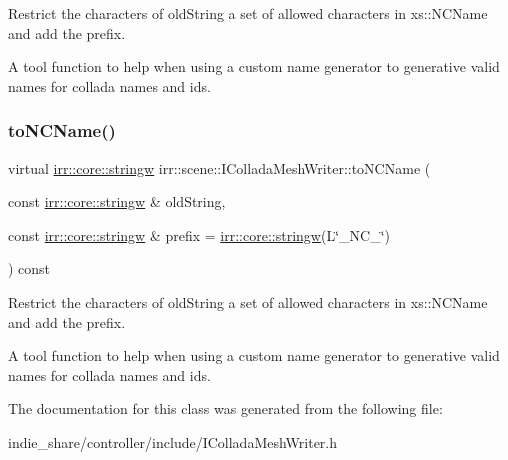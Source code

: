 Restrict the characters of old\+String a set of allowed characters in xs\+::\+N\+C\+Name and add the prefix. 

A tool function to help when using a custom name generator to generative valid names for collada names and id\textquotesingle{}s. \mbox{\label{classirr_1_1scene_1_1IColladaMeshWriter_ac9c48beab095aa6f4cb4f696bb2ecd45}} 
\subsubsection{\texorpdfstring{to\+N\+C\+Name()}{toNCName()}\hspace{0.1cm}{\footnotesize\ttfamily [2/2]}}
{\footnotesize\ttfamily virtual \hyperlink{namespaceirr_1_1core_a5aedb62cb47cf01d1c548ab5e6344d2d}{irr\+::core\+::stringw} irr\+::scene\+::\+I\+Collada\+Mesh\+Writer\+::to\+N\+C\+Name (\begin{DoxyParamCaption}\item[{const \hyperlink{namespaceirr_1_1core_a5aedb62cb47cf01d1c548ab5e6344d2d}{irr\+::core\+::stringw} \&}]{old\+String,  }\item[{const \hyperlink{namespaceirr_1_1core_a5aedb62cb47cf01d1c548ab5e6344d2d}{irr\+::core\+::stringw} \&}]{prefix = {\ttfamily \hyperlink{namespaceirr_1_1core_a5aedb62cb47cf01d1c548ab5e6344d2d}{irr\+::core\+::stringw}(L\char`\"{}\+\_\+NC\+\_\+\char`\"{})} }\end{DoxyParamCaption}) const\hspace{0.3cm}{\ttfamily [pure virtual]}}



Restrict the characters of old\+String a set of allowed characters in xs\+::\+N\+C\+Name and add the prefix. 

A tool function to help when using a custom name generator to generative valid names for collada names and id\textquotesingle{}s. 

The documentation for this class was generated from the following file\+:\begin{DoxyCompactItemize}
\item 
indie\+\_\+share/controller/include/I\+Collada\+Mesh\+Writer.\+h\end{DoxyCompactItemize}
